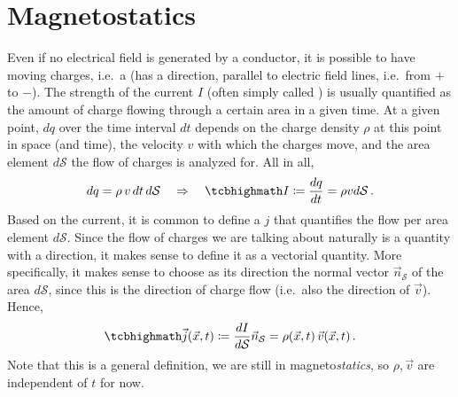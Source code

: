 \documentclass[../class_mech_main.tex]{subfiles}
\begin{document}
    \section{Magnetostatics}
Even if no electrical field is generated by a conductor, it is possible to have moving charges, i.e.~a  (has a direction, parallel to electric field lines, i.e.~from $+$ to $-$). The strength of the current $I$ (often simply called ) is usually quantified as the amount of charge flowing through a certain area in a given time. At a given point, $dq$ over the time interval $dt$ depends on the charge density $\rho$ at this point in space (and time), the velocity $v$ with which the charges move, and the area element $d\mathcal{S}$ the flow of charges is analyzed for. All in all,
\begin{equation}
        dq = \rho \, v \, dt \, d\mathcal{S}
    \quad\Rightarrow\quad
    \eqbox{
        I \coloneqq \dv{q}{t} = \rho v d\mathcal{S}
    } \, .  
\end{equation}
Based on the current, it is common to define a  $j$ that quantifies the flow per area element $d\mathcal{S}$. Since the flow of charges we are talking about naturally is a quantity with a direction, it makes sense to define it as a vectorial quantity. More specifically, it makes sense to choose as its direction the normal vector $\vec{n}_\mathcal{S}$ of the area $d\mathcal{S}$, since this is the direction of charge flow (i.e.~also the direction of $\vec{v}$). Hence,
\begin{equation}
    \eqbox{
        \vec{j}(\vec{x}, t) \coloneqq \dv{I}{\mathcal{S}} \vec{n}_\mathcal{S} = \rho(\vec{x}, t) \, \vec{v}(\vec{x}, t)
    } \, .
\end{equation}
Note that this is a general definition, we are still in magneto\emph{statics}, so $\rho, \vec{v}$ are independent of $t$ for now.
\\
\end{document}
